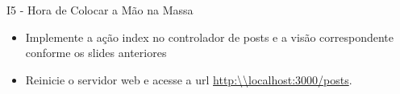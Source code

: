 \begin{frame}[t, fragile]{I5 - Hora de Colocar a Mão na Massa}
	\begin{itemize}
		\item Implemente a ação \alert{index} no controlador de posts e a visão correspondente conforme os slides anteriores
		\item Reinicie o servidor web e acesse a url \url{http:\\localhost:3000/posts}. 
	\end{itemize}
\end{frame}